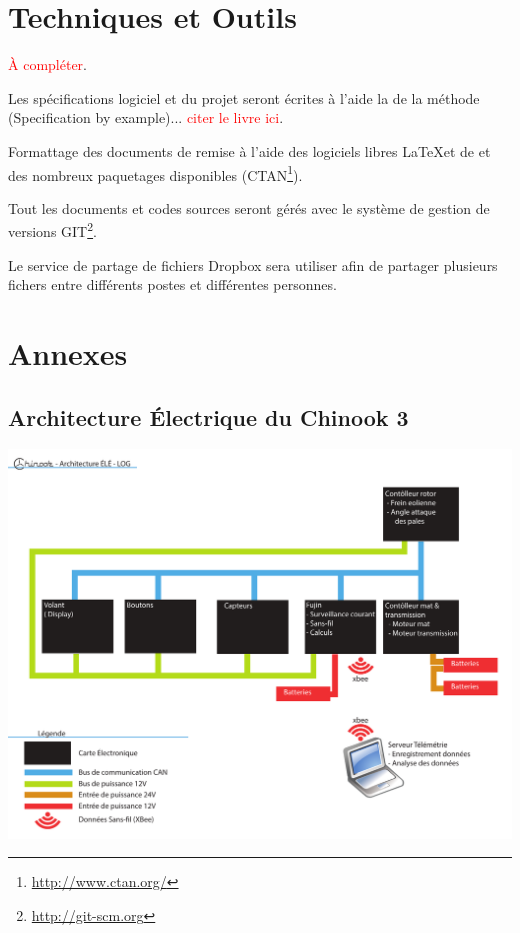 \documentclass[11pt]{article}
\begin{document}
\section{Techniques et Outils}

\textcolor{red}{À compléter}.

Les spécifications logiciel et du projet seront écrites à l'aide la de la méthode (Specification by example)... \textcolor{red}{citer le livre ici}.

Formattage des documents de remise à l'aide des logiciels libres \LaTeX et de \XeLaTeX et des nombreux paquetages disponibles (CTAN\footnote{\url{http://www.ctan.org/}}).

Tout les documents et codes sources seront gérés avec le système de gestion de versions GIT\footnote{\url{http://git-scm.org}}.

Le service de partage de fichiers Dropbox sera utiliser afin de partager plusieurs fichers entre différents postes et différentes personnes.





\clearpage

\section*{Annexes}
\begin{appendices}


\section{Architecture Électrique du Chinook 3}
\label{fig:archELE}
\includegraphics[height=1\textwidth,angle=90]{images/Architecture_ÉLÉ-LOG.pdf}

\end{appendices}
\end{document}
